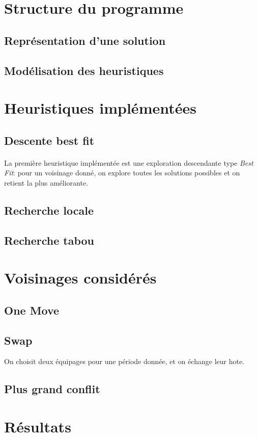 \documentclass[a4paper,10pt]{report}
\begin{document}
\section{Structure du programme}
\subsection{Représentation d'une solution}


\subsection{Modélisation des heuristiques}



\section{Heuristiques implémentées}
\subsection{Descente best fit}
\paragraph{}
La première heuristique implémentée est une exploration descendante type \textit{Best Fit}: pour un voisinage donné,
on explore toutes les solutions possibles et on retient la plus améliorante. 

\subsection{Recherche locale}

\subsection{Recherche tabou}

\section{Voisinages considérés}
\subsection{One Move}


\subsection{Swap}
On choisit deux équipages pour une période donnée, et on échange leur hote.

\subsection{Plus grand conflit}


\pagebreak
\section{Résultats}
\end{document}

